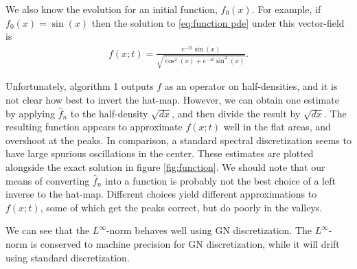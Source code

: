 \documentclass[12pt]{amsart}
\begin{document}
We also know the evolution for an initial function, $f_{0}(x)$.
For example, if $f_{0}(x) = \sin(x)$ then the solution to \eqref{eq:function pde} under this vector-field is
\begin{align}
	f(x;t) = \frac{ e^{-2t} \sin(x) }{ \sqrt{ \cos^{2}(x) + e^{-4t} \sin^{2}(x) } }.
\end{align}

Unfortunately, algorithm 1 outputs $f$ as an operator on half-densities, and it is not clear how best to invert the hat-map.
However, we can obtain one estimate by applying $\hat{f}_{n}$ to the half-density $\sqrt{dx}$, and then divide the result by $\sqrt{dx}$.
The resulting function appears to approximate $f(x;t)$ well in the flat areas, and overshoot at the peaks.
In comparison, a standard spectral discretization seems to have large spurious oscillations in the center.
These estimates are plotted alongside the exact solution in figure \ref{fig:function}.
We should note that our means of converting $\hat{f}_{n}$ into a function is probably not the best choice of a left inverse to the hat-map.
Different choices yield different approximations to $f(x;t)$, some
of which get the peaks correct, but do poorly in the valleys.

We can see that the $L^{\infty}$-norm behaves well using GN discretization.
The $L^{\infty}$-norm is conserved to machine precision for GN discretization, while it will drift using standard discretization.
\end{document}
